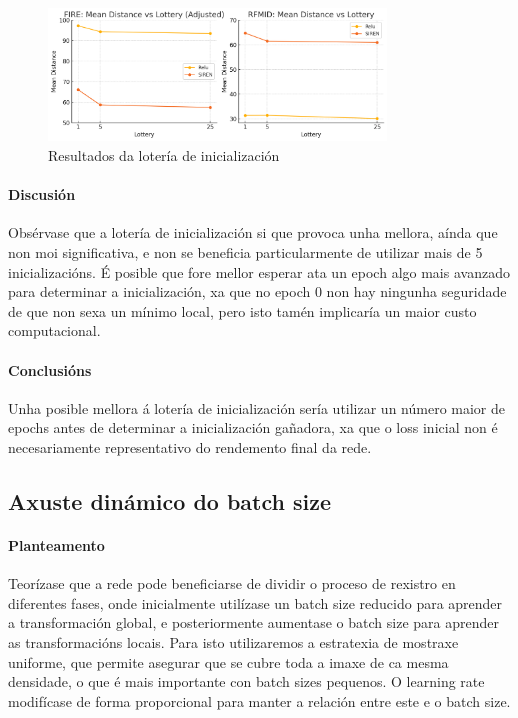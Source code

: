 \begin{figure}[ht]
    \centering
    \includegraphics[width=0.8\textwidth]{imaxes/lottery/lotery.png}
    \caption{Resultados da lotería de inicialización}
    \label{fig:lottery}
\end{figure}

\FloatBarrier

\paragraph{Discusión}
\label{par:Discusion-initialization}

Obsérvase que a lotería de inicialización si que provoca unha mellora, aínda que non moi significativa, e non se beneficia particularmente de utilizar mais de 5 inicializacións.
É posible que fore mellor esperar ata un epoch algo mais avanzado para determinar a inicialización, xa que no epoch 0 non hay ningunha seguridade de que non sexa un mínimo local, pero isto tamén implicaría un maior custo computacional.

\paragraph{Conclusións}
\label{par:Conclusions-initialization}

Unha posible mellora á lotería de inicialización sería utilizar un número maior de epochs antes de determinar a inicialización gañadora, xa que o loss inicial non é necesariamente representativo do rendemento final da rede.

\subsection{Axuste dinámico do batch size}
\label{subsec:Dynamic batch size}
\paragraph{Planteamento}
\label{par:Planteamento-phases}

Teorízase que a rede pode beneficiarse de dividir o proceso de rexistro en diferentes fases, onde inicialmente utilízase un batch size reducido para aprender a transformación global, e posteriormente aumentase o batch size para aprender as transformacións locais.
Para isto utilizaremos a estratexia de mostraxe uniforme, que permite asegurar que se cubre toda a imaxe de ca mesma densidade, o que é mais importante con batch sizes pequenos. O learning rate modifícase de forma proporcional para manter a relación entre este e o batch size.

